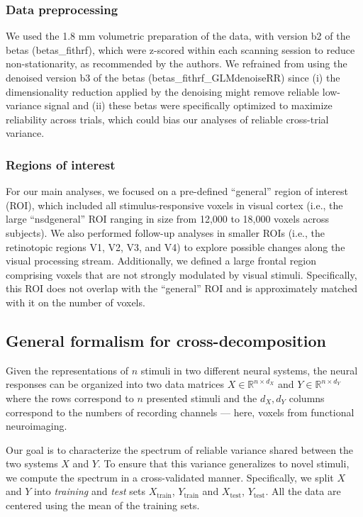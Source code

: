 \documentclass[10pt]{article}
\begin{document}
\subsubsection{Data preprocessing}\label{data-preprocessing}

We used the 1.8 mm volumetric preparation of the data, with version b2 of the betas (betas\_fithrf), which were z-scored within each scanning session to reduce non-stationarity, as recommended by the authors. We refrained from using the denoised version b3 of the betas (betas\_fithrf\_GLMdenoiseRR) since (i) the dimensionality reduction applied by the denoising might remove reliable low-variance signal and (ii) these betas were specifically optimized to maximize reliability across trials, which could bias our analyses of reliable cross-trial variance.

\subsubsection{Regions of interest}\label{regions-of-interest}

For our main analyses, we focused on a pre-defined ``general'' region of interest (ROI), which included all stimulus-responsive voxels in visual cortex (i.e., the large ``nsdgeneral'' ROI ranging in size from 12,000 to 18,000 voxels across subjects). We also performed follow-up analyses in smaller ROIs (i.e., the retinotopic regions V1, V2, V3, and V4) to explore possible changes along the visual processing stream. Additionally, we defined a large frontal region comprising voxels that are not strongly modulated by visual stimuli. Specifically, this ROI does not overlap with the ``general'' ROI and is approximately matched with it on the number of voxels.

\subsection{General formalism for cross-decomposition}\label{general-formalism-for-cross-decomposition}

Given the representations of \(n\) stimuli in two different neural systems, the neural responses can be organized into two data matrices \(X \in \mathbb{R}^{n \times d_X}\) and \(Y \in \mathbb{R}^{n \times d_Y}\) where the rows correspond to \(n\) presented stimuli and the \(d_X, d_Y\) columns correspond to the numbers of recording channels --- here, voxels from functional neuroimaging.

Our goal is to characterize the spectrum of reliable variance shared between the two systems \(X\) and \(Y\). To ensure that this variance generalizes to novel stimuli, we compute the spectrum in a cross-validated manner. Specifically, we split \(X\) and \(Y\) into \emph{training} and \emph{test} sets \(X_\text{train}\), \(Y_\text{train}\) and \(X_\text{test}\), \(Y_\text{test}\). All the data are centered using the mean of the training sets.
\end{document}
